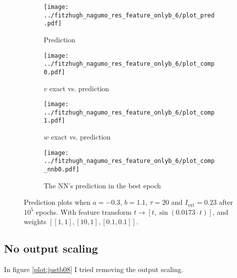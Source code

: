 \documentclass[a4paper]{article}
\begin{document}
\begin{figure}[H]
	\centering 
	\begin{subfigure}[b]{0.47\textwidth}
		\centering
		\texttt{[image: ../fitzhugh\_nagumo\_res\_feature\_onlyb\_6/plot\_pred.pdf]}
		\caption{Prediction}
		\label{fig:justb07a}
	\end{subfigure}
	\begin{subfigure}[b]{0.47\textwidth}
		\centering
		\texttt{[image: ../fitzhugh\_nagumo\_res\_feature\_onlyb\_6/plot\_comp0.pdf]}
		\caption{$v$ exact vs. prediction}
		\label{fig:justb07b}
	\end{subfigure}
	\begin{subfigure}[b]{0.47\textwidth}
		\centering
		\texttt{[image: ../fitzhugh\_nagumo\_res\_feature\_onlyb\_6/plot\_comp1.pdf]}
		\caption{$w$ exact vs. prediction}
		\label{fig:justb07c}
	\end{subfigure}
	\begin{subfigure}[b]{0.47\textwidth}
		\centering
		\texttt{[image: ../fitzhugh\_nagumo\_res\_feature\_onlyb\_6/plot\_comp\_nnb0.pdf]}
		\caption{The NN's prediction in the best epoch}
		\label{fig:justb07d}
	\end{subfigure}
	\caption{Prediction plots when $a=-0.3$, $b=1.1$, $\tau=20$ and $ I_{\text{ext}}=0.23$ after $10^5$ epochs. With feature transform $t \rightarrow \left[ t, \sin(0.0173\cdot t) \right] $, and weights $\left[ \left[ 1, 1\right], \left[ 10, 1\right], \left[ 0.1, 0.1 \right]\right]$.}
	\label{plot:justb07}
\end{figure} 	


\subsection{No output scaling}

In figure \ref{plot:justb08} I tried removing the output scaling.
\end{document}
